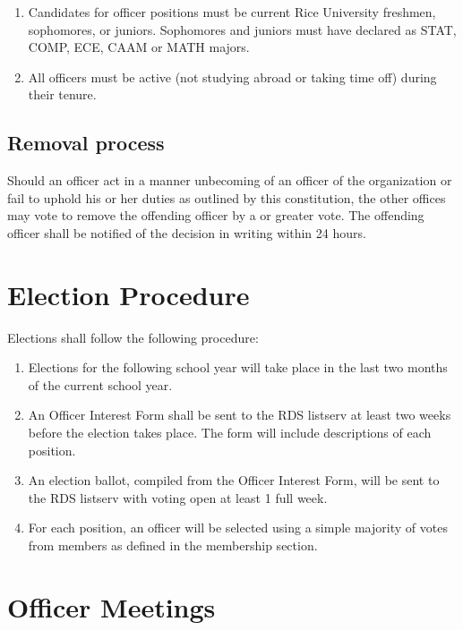 \documentclass[12pt]{article}
\begin{document}
\begin{enumerate}
  \item Candidates for officer positions must be current Rice University
    freshmen, sophomores, or juniors. Sophomores and juniors must have declared
    as STAT, COMP, ECE, CAAM or MATH majors. 

  \item All officers must be active (not studying abroad or taking time off)
    during their tenure. 
\end{enumerate}

\subsection{Removal process}

Should an officer act in a manner unbecoming of an officer of the organization
or fail to uphold his or her duties as outlined by this constitution, the other
offices may vote to remove the offending officer by a  or greater
vote. The offending officer shall be notified of the decision in writing within
24 hours.


\section{Election Procedure}

Elections shall follow the following procedure:
\begin{enumerate}
  \item Elections for the following school year will take place in the last 
    two months of the current school year.

  \item An Officer Interest Form shall be sent to the RDS listserv at least two
    weeks before the election takes place.  The form will include descriptions
    of each position.

  \item An election ballot, compiled from the Officer Interest Form, will be sent
    to the RDS listserv with voting open at least 1 full week.

  \item For each position, an officer will be selected using a simple majority
    of votes from members as defined in the membership section.
\end{enumerate}


\section{Officer Meetings}
\end{document}
